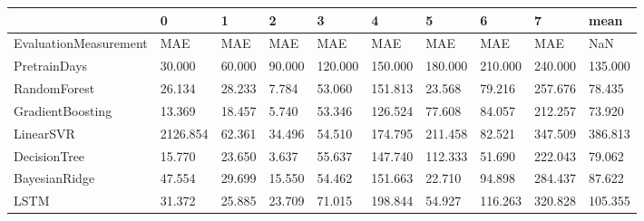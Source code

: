 \begin{tabular}{llllllllll}
\toprule
{} &        0 &      1 &      2 &       3 &       4 &       5 &       6 &       7 &    mean \\
\midrule
EvaluationMeasurement &      MAE &    MAE &    MAE &     MAE &     MAE &     MAE &     MAE &     MAE &     NaN \\
PretrainDays          &   30.000 & 60.000 & 90.000 & 120.000 & 150.000 & 180.000 & 210.000 & 240.000 & 135.000 \\
RandomForest          &   26.134 & 28.233 &  7.784 &  53.060 & 151.813 &  23.568 &  79.216 & 257.676 &  78.435 \\
GradientBoosting      &   13.369 & 18.457 &  5.740 &  53.346 & 126.524 &  77.608 &  84.057 & 212.257 &  73.920 \\
LinearSVR             & 2126.854 & 62.361 & 34.496 &  54.510 & 174.795 & 211.458 &  82.521 & 347.509 & 386.813 \\
DecisionTree          &   15.770 & 23.650 &  3.637 &  55.637 & 147.740 & 112.333 &  51.690 & 222.043 &  79.062 \\
BayesianRidge         &   47.554 & 29.699 & 15.550 &  54.462 & 151.663 &  22.710 &  94.898 & 284.437 &  87.622 \\
LSTM                  &   31.372 & 25.885 & 23.709 &  71.015 & 198.844 &  54.927 & 116.263 & 320.828 & 105.355 \\
\bottomrule
\end{tabular}
